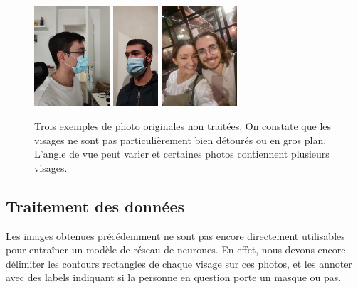 \documentclass{article}
\begin{document}
\begin{figure}[h]
\centering
\includegraphics[width=0.25\textwidth]{non_traite1.jpg}
\includegraphics[width=0.15\textwidth]{non_traite3.jpg}
\includegraphics[width=0.25\textwidth]{non_traite2.jpg}
\caption{\label{fig:Input}Trois exemples de photo originales non traitées. On constate que les visages ne sont pas particulièrement bien détourés ou en gros plan. L'angle de vue peut varier et certaines photos contiennent plusieurs visages.}
\end{figure}



\subsection{Traitement des données}
Les images obtenues précédemment ne sont pas encore directement utilisables pour entraîner un modèle de réseau de neurones. En effet, nous devons encore délimiter les contours rectangles de chaque visage sur ces photos, et les annoter avec des labels indiquant si la personne en question porte un masque ou pas.\\\\
\end{document}
